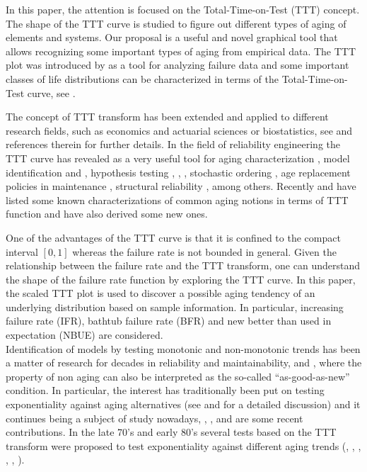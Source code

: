 \documentclass[preprint,12pt]{elsarticle}
\begin{document}
In this paper,  the attention is focused on the Total-Time-on-Test (TTT) concept.  The shape of the TTT curve is studied to figure out different types of aging of elements and systems. Our proposal is a useful and novel graphical tool that allows recognizing some important types of aging from empirical data.
The TTT plot was introduced by \cite{BC75} as a tool for analyzing failure data and some important classes of life distributions can be characterized in terms of the Total-Time-on-Test curve, see \cite{BK84}. 


The concept of TTT transform  has been extended and applied to different research fields, such as economics and actuarial sciences or biostatistics, see \cite{NS2013} and references therein for further details. In the field of reliability engineering the TTT curve has revealed as a very useful tool for aging characterization \cite{NS2013}, model identification \cite{Klefsjo82} and \cite{RH04},  hypothesis testing \cite{Klefsjo83a}, \cite{Klefsjo83b}, \cite{Kochar85},  stochastic ordering \cite{NSB2013}, age replacement policies in maintenance \cite{ZHMS2018}, structural reliability \cite{LS2019}, among others.  Recently \cite{NS2013} and \cite{FPS2014} have listed some known characterizations of common aging notions in terms of TTT function and have also derived some new ones. 

One of the advantages of the TTT curve is that it is confined to the compact interval $[0,1]$ whereas the failure rate is not bounded in general. Given the relationship between the failure rate and the TTT transform, one can understand the shape of the failure rate function by exploring the TTT curve. 
In this paper, the scaled TTT plot is used to discover a possible aging tendency of an underlying distribution based on sample information. In particular, increasing failure rate (IFR), bathtub failure rate (BFR) and new better than used in expectation (NBUE) are considered. \\
 
Identification of models by testing monotonic and non-monotonic trends has been a matter of research for decades in reliability and maintainability, \cite{KL98} and \cite{VV09}, where the property of non aging can also be interpreted as the so-called ``as-good-as-new'' condition. In particular, the interest has traditionally been put on testing exponentiality against aging alternatives (see \cite{LX06} and \cite{Anis2013} for a detailed discussion) and it continues being a subject of study nowadays, \cite{SSA2018}, \cite{IM2019}, and \cite{CMO2019} are some recent contributions. 
In the late 70's and early 80's several tests based on the TTT transform  were proposed  to test exponentiality against different aging trends (\cite{HP72}, \cite{Bergman79}, \cite{Klefsjo82}, \cite{Klefsjo83a}, \cite{Klefsjo83b}, \cite{Kochar85}).  
\end{document}
